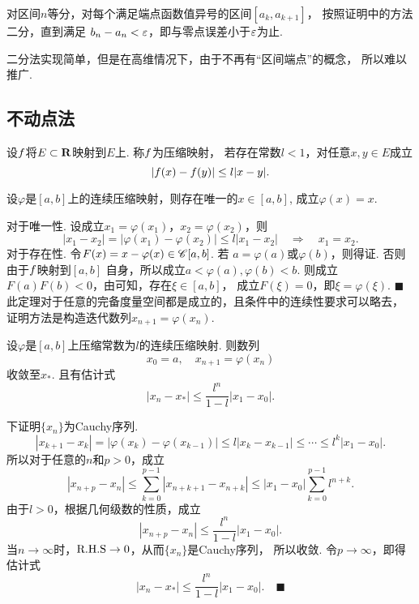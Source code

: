   \begin{alg}[二分法求解零点]
    对区间$n$等分，对每个满足端点函数值异号的区间$[a_k,a_{k+1}]$，
    按照证明中的方法二分，直到满足
    $b_n-a_n<\varepsilon$，即与零点误差小于$\varepsilon$为止.
  \end{alg}
  \remark
    二分法实现简单，但是在高维情况下，由于不再有“区间端点”的概念，
    所以难以推广.

\subsection{不动点法}
  \begin{defi}[压缩映射]
    设$\mathnormal{f}$将$E\subset\mathbf{R}$映射到$E$上. 称$\mathnormal{f}$为压缩映射，
    若存在常数$l<1$，对任意$x,y\in E$成立
    \[
      |\mathnormal{f}(x) - \mathnormal{f}(y)| \le l|x-y|.
    \]
  \end{defi}

  \begin{thm}[压缩映射定理]
    \label{thm: 压缩映射定理}
    设$\varphi$是$[a,b]$上的连续压缩映射，则存在唯一的$x\in[a, b]$,
    成立$\varphi(x) = x$.
  \end{thm}
  \proof
    对于唯一性. 设成立$x_1=\varphi(x_1)$，$x_2=\varphi(x_2)$，则
    \[
      |x_1-x_2| = |\varphi(x_1)-\varphi(x_2)|\le l|x_1-x_2|
      \quad\Rightarrow\quad x_1=x_2.
    \]
    对于存在性. 令$F(x)=x-\varphi(x)\in\mathscr{C}[a, b]$. 若
    $a=\varphi(a)$或$\varphi(b)$，则得证. 否则由于$\mathnormal{f}$映射到$[a,b]$
    自身，所以成立$a<\varphi(a), \varphi(b)<b$. 则成立
    $F(a)F(b)<0$，由可知，存在$\xi\in[a,b]$，
    成立$F(\xi)=0$，即$\xi=\varphi(\xi)$. $\blacksquare$
  \remark
    此定理对于任意的完备度量空间都是成立的，且条件中的连续性要求可以略去，
    证明方法是构造迭代数列$x_{n+1}=\varphi(x_n)$.

  \begin{thm}[余项估计]
    设$\varphi$是$[a, b]$上压缩常数为$l$的连续压缩映射. 则数列
    \[
      x_0 = a,\quad x_{n+1} = \varphi(x_n)
    \]
    收敛至$x_*$. 且有估计式
    \[
      |x_n - x_*| \le \frac{l^n}{1-l}|x_1-x_0|.
    \]
  \end{thm}
  \proof
    下证明$\{x_n\}$为Cauchy序列.
    \[
      |x_{k+1}-x_k| = |\varphi(x_k) - \varphi(x_{k-1})|
      \le l|x_k-x_{k-1}| \le \cdots \le l^k|x_1-x_0|.
    \]
    所以对于任意的$n$和$p>0$，成立
    \[
      |x_{n+p}-x_n|\le \sum_{k=0}^{p-1} |x_{n+k+1}-x_{n+k}|
      \le |x_1-x_0|\sum_{k=0}^{p-1}l^{n+k}.
    \]
    由于$l>0$，根据几何级数的性质，成立
    \[
      |x_{n+p}-x_n| \le \frac{l^n}{1-l}|x_1-x_0|.
    \]
    当$n\to\infty$时，$\text{R.H.S}\to 0$，从而$\{x_n\}$是Cauchy序列，
    所以收敛. 令$p\to\infty$，即得估计式
    \[
      |x_n-x_*| \le \frac{l^n}{1-l}|x_1-x_0|.
      \quad\blacksquare
    \]

